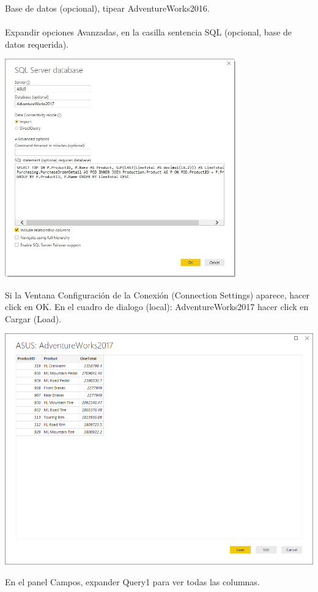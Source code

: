 \documentclass[12pt,letterpaper]{article}
\begin{document}
Base de datos (opcional), tipear AdventureWorks2016.\\\\
Expandir opciones Avanzadas, en la casilla sentencia SQL (opcional, base de datos requerida). 
\begin{center}
    \includegraphics[width=10cm]{img/14.jpg}  
\end{center}
Si la Ventana Configuración de la Conexión (Connection Settings) aparece, hacer click en OK.
En el cuadro de dialogo (local): AdventureWorks2017 hacer click en Cargar (Load).
\begin{center}
    \includegraphics[width=16cm]{img/15.png}  
\end{center}
En el panel Campos, expander Query1 para ver todas las columnas.
\end{document}
